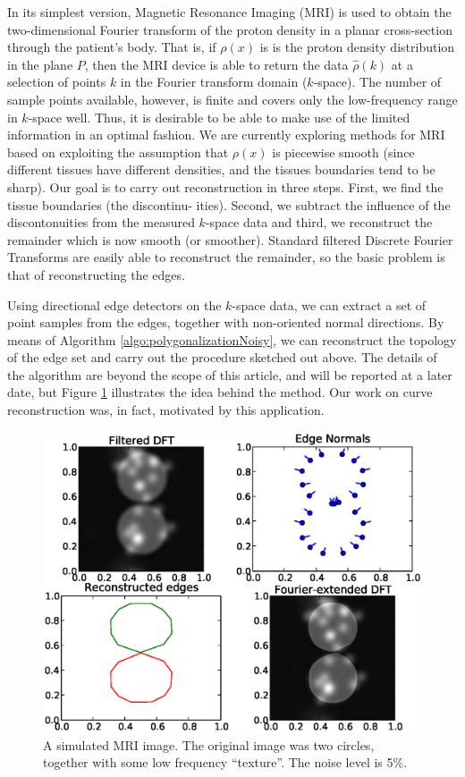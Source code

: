\documentclass{article}
\numberwithin{cntr}{section}
\numberwithin{equation}{section}
\begin{document}
In its simplest version, Magnetic Resonance Imaging (MRI) is
used to obtain the 
two-dimensional Fourier transform of the proton density in a
planar cross-section through the patient's body. 
That is, if $\rho(x)$ is
is the proton density distribution in the plane $P$, then the MRI device
is able to return the data $\hat{\rho}(k)$ at a selection of 
points $k$ in the Fourier transform domain ($k$-space). 
The number of sample points available, however, is finite and covers
only the low-frequency range in $k$-space well.
Thus, it is desirable to be able to make use of the limited 
information in an optimal fashion.
We are currently exploring methods for MRI based on 
exploiting the assumption that
$\rho(x)$ is piecewise smooth (since different tissues have different
densities, and the tissues boundaries tend to be sharp). 
Our goal is to carry out reconstruction in three steps.
First, we find the tissue boundaries (the discontinu-
ities). Second, we subtract the influence of the discontonuities from
the measured $k$-space data and third, we reconstruct the remainder which 
is now smooth (or smoother). Standard filtered Discrete Fourier Transforms
are easily able to reconstruct the remainder, so the basic
problem is that of reconstructing the edges.

Using directional edge detectors on the $k$-space data, we can extract
a set of point samples from the edges, together with non-oriented normal 
directions.  By means of
Algorithm \ref{algo:polygonalizationNoisy}, we can 
reconstruct the topology of the edge set and carry out the 
procedure sketched out above.
The details of the algorithm are beyond the scope of this article, 
and will be reported at a later date, 
but Figure \ref{fig:mriExample} 
illustrates the idea behind the method. Our work on curve reconstruction was,
in fact, motivated by this application.

\begin{figure}
\setlength{\unitlength}{0.240900pt}
\ifx\plotpoint\undefined\newsavebox{\plotpoint}\fi
\sbox{\plotpoint}{\rule[-0.200pt]{0.400pt}{0.400pt}}%
\includegraphics[scale=0.5]{mri_edges.eps}
\caption{A simulated MRI image. The original image was two circles, together with some low frequency ``texture''. The noise level is 5\%.}
\label{fig:mriExample}
\end{figure}
\end{document}
